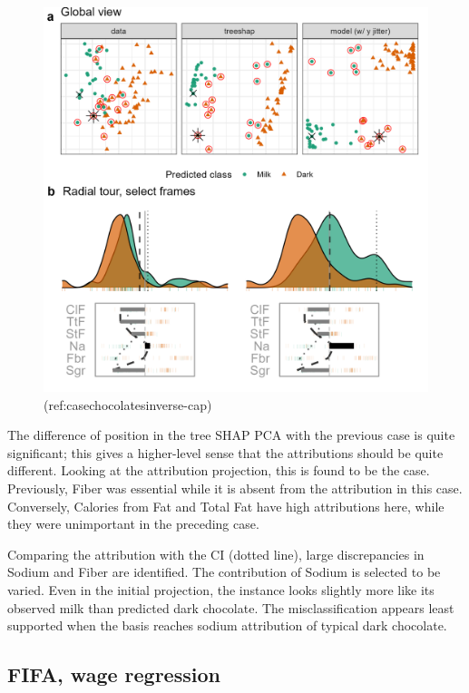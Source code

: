 \documentclass[
]{article}
\begin{document}
\begin{figure}

{\centering \includegraphics[width=1\linewidth]{./figures/case_chocolates_inverse} 

}

\caption{(ref:casechocolatesinverse-cap)}\label{fig:casechocolatesinverse}
\end{figure}

The difference of position in the tree SHAP PCA with the previous case
is quite significant; this gives a higher-level sense that the
attributions should be quite different. Looking at the attribution
projection, this is found to be the case. Previously, Fiber was
essential while it is absent from the attribution in this case.
Conversely, Calories from Fat and Total Fat have high attributions here,
while they were unimportant in the preceding case.

Comparing the attribution with the CI (dotted line), large discrepancies
in Sodium and Fiber are identified. The contribution of Sodium is
selected to be varied. Even in the initial projection, the instance
looks slightly more like its observed milk than predicted dark
chocolate. The misclassification appears least supported when the basis
reaches sodium attribution of typical dark chocolate.

\hypertarget{fifa-wage-regression}{%
\subsection{FIFA, wage regression}\label{fifa-wage-regression}}
\end{document}
